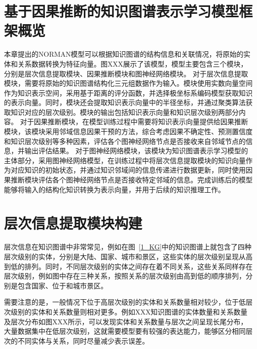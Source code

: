 \documentclass[algorithmlist, AutoFakeBold, AutoFakeSlant, figurelist, tablelist, nomlist, masters]{seuthesix}
\begin{document}
\section{基于因果推断的知识图谱表示学习模型框架概览}
本章提出的NORMAN模型可以根据知识图谱的结构信息和关联情况，将原始的实体和关系数据转换为特征向量。图XXX展示了该模型，模型主要包含三个模块，分别是层次信息提取模块、因果推断模块和图神经网络模块。
对于层次信息提取模块，需要将原始的知识图谱结构化三元组数据作为输入。模块使用实数向量空间作为知识表示空间，采用基于距离的评分函数，并选择极坐标系编码模型获取知识的表示向量。同时，模块还会提取知识表示向量中的半径坐标，并通过聚类算法获取知识对应的层次级别。模块的输出包括知识表示向量和知识层次级别两部分内容。
对于因果推断模块，在模型训练过程中需要将知识表示向量提供给因果推断模块，该模块采用邻域信息因果干预的方法，综合考虑因果不确定性、预测置信度和知识层次级别等多种因素，评估各个图神经网络节点是否接收来自邻域节点的信息，并输出评估结果。
对于图神经网络模块，该模块为知识图谱表示学习模型的主体部分，采用图神经网络模型，在训练过程中将层次信息提取模块的知识向量作为对应知识的初始状态，并通过知识邻域间的信息传递进行数据更新，同时使用因果推断模块评估各个图神经网络节点是否接收特定邻域的信息。完成训练后的模型能够将输入的结构化知识转换为表示向量，并用于后续的知识推理工作。

\section{层次信息提取模块构建}
层次信息在知识图谱中非常常见，例如在图~\ref{1_KG}中的知识图谱上就包含了四种层次级别的实体，分别是大陆、国家、城市和景区，这些实体的层次级别呈现从高到低的排列。同时，不同层次级别的实体之间存在着不同关系，这些关系同样存在层次级别，例如图中存在三种关系，按照关系的层次级别由高到低的顺序排列，分别是包含国家、位于和城市景区。

需要注意的是，一般情况下位于高层次级别的实体和关系数量相对较少，位于低层次级别的实体和关系数量则相对更多。例如XXX知识图谱的实体数量和关系数量及层次分布如图XXX所示，可以发现实体和关系数量与层次之间呈现长尾分布，大量数据集中在低层次级别，这就需要模型要有较强的表达能力，能够区分相同层次的不同实体与关系，同时尽量减少表示误差。
\end{document}
